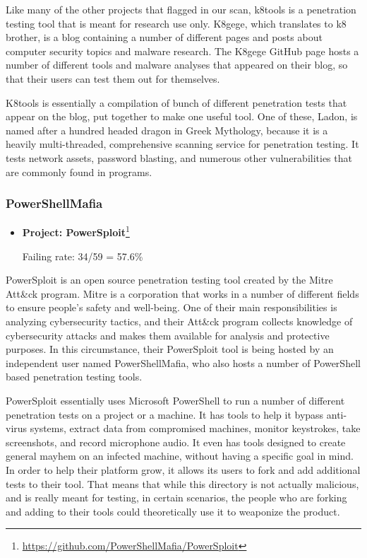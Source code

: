 \documentclass[]{acmart}
\begin{document}
Like many of the other projects that flagged in our scan, k8tools is a penetration testing tool that is meant for research use only. K8gege, which translates to k8 brother, is a blog containing a number of different pages and posts about computer security topics and malware research. The K8gege GitHub page hosts a number of different tools and malware analyses that appeared on their blog, so that their users can test them out for themselves.

K8tools is essentially a compilation of bunch of different penetration tests that appear on the blog, put together to make one useful tool. One of these, Ladon, is named after a hundred headed dragon in Greek Mythology, because it is a heavily multi-threaded, comprehensive scanning service for penetration testing. It tests network assets, password blasting, and numerous other vulnerabilities that are commonly found in programs.


\subsubsection{PowerShellMafia}
\begin{itemize}
    \item { \bf Project: PowerSploit}\footnote{{\url{https://github.com/PowerShellMafia/PowerSploit}}}
    
    Failing rate: 34/59 = 57.6\%
\end{itemize}

PowerSploit is an open source penetration testing tool created by the Mitre Att\&ck program. Mitre is a corporation that works in a number of different fields to ensure people's safety and well-being. One of their main responsibilities is analyzing cybersecurity tactics, and their Att\&ck program collects knowledge of cybersecurity attacks and makes them available for analysis and protective purposes. In this circumstance, their PowerSploit tool is being hosted by an independent user named PowerShellMafia, who also hosts a number of PowerShell based penetration testing tools.

PowerSploit essentially uses Microsoft PowerShell to run a number of different penetration tests on a project or a machine. It has tools to help it bypass anti-virus systems, extract data from compromised machines, monitor keystrokes, take screenshots, and record microphone audio. It even has tools designed to create general mayhem on an infected machine, without having a specific goal in mind. In order to help their platform grow, it allows its users to fork and add additional tests to their tool. That means that while this directory is not actually malicious, and is really meant for testing, in certain scenarios, the people who are forking and adding to their tools could theoretically use it to weaponize the product.
\end{document}
